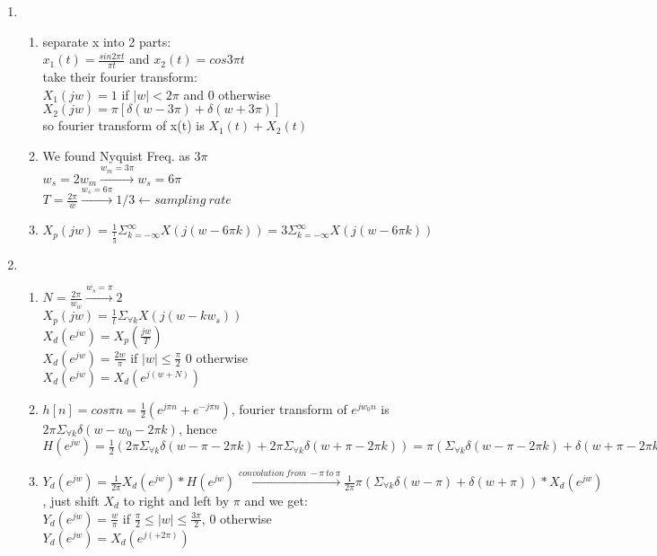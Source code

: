 \documentclass[10pt,a4paper, margin=1in]{article}
\begin{document}
\begin{enumerate}
\item      
    \begin{enumerate}
    \item %
    separate x into 2 parts:\\
    $x_1(t)=\frac{sin2\pi t}{\pi t}$ and $x_2(t)=cos3\pi t $\\
    take their fourier transform:\\
    $X_1(jw)=1$ if $|w|<2\pi$ and 0 otherwise\\
    $X_2(jw)=\pi [\delta(w-3\pi)+\delta(w+3\pi)]$\\
    so fourier transform of x(t) is $X_1(t)+X_2(t)$
    \item %
    We found Nyquist Freq. as $3\pi$\\
    $w_s=2w_m\xrightarrow{w_m=3\pi}w_s=6\pi$\\
    $T=\frac{2\pi}{w}\xrightarrow{w_s=6\pi}1/3\xleftarrow{}sampling \ rate$
    \item
    $X_p(jw)=\frac{1}{\frac{1}{3}}\Sigma_{k=-\infty}^{\infty}X(j(w-6\pi k))=3\Sigma_{k=-\infty}^{\infty}X(j(w-6\pi k))$
    \end{enumerate}

\item 
    \begin{enumerate}
    \item %
    $N=\frac{2\pi}{w_w}\xrightarrow{w_s=\pi}2$\\
    $X_p(jw)=\frac{1}{t}\Sigma_{\forall k}X(j(w-kw_s))$\\
    $X_d(e^{jw})=X_p(\frac{jw}{T})$\\
    $X_d(e^{jw})=\frac{2w}{\pi}$ if $|w|\leq \frac{\pi}{2}$ 0 otherwise\\
    $X_d(e^{jw})=X_d(e^{j(w+N)})$
    
    \item %
    $h[n]=cos\pi n = \frac{1}{2}(e^{j\pi n}+e^{-j\pi n})$, fourier transform of $e^{jw_0 n}$ is $ 2\pi \Sigma_{\forall k}\delta(w-w_0-2\pi k)$, hence\\
    $H(e^{jw})=\frac{1}{2}(2\pi \Sigma_{\forall k }\delta(w-\pi-2\pi k )+2\pi\Sigma_{\forall k }\delta(w+\pi -2\pi k))=\pi( \Sigma_{\forall k }\delta(w-\pi-2\pi k )+\delta(w+\pi -2\pi k))$
    \item %
    $Y_d(e^{jw})=\frac{1}{2\pi}X_d(e^{jw})*H(e^{jw})\xrightarrow{convolution\ from\ -\pi \ to\ \pi}\frac{1}{2\pi}\pi(\Sigma_{\forall k}\delta(w-\pi)+\delta(w+\pi)) * X_d(e^{jw})$, just shift $X_d$ to right and left by $\pi$ and we get:\\
    $Y_d(e^{jw})=\frac{w}{\pi}$ if $\frac{\pi}{2}\leq |w|\leq \frac{3\pi}{2}$, 0 otherwise\\
    $Y_d(e^{jw})=X_d(e^{j(+2\pi)})$
    \end{enumerate}


\end{enumerate}
\end{document}

